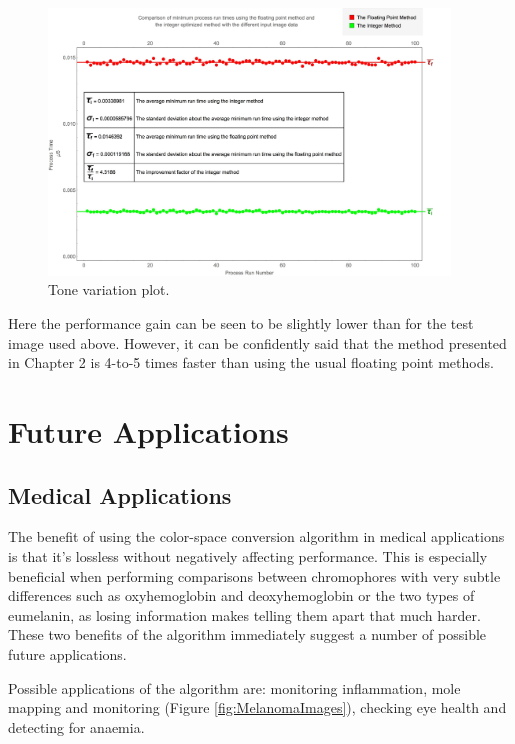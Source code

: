 \begin{figure}[h!]
  \centering
    \includegraphics[width=0.95\textwidth]{Chapter5/Figs/Tone_Variation_Plot.jpg}
    \caption{Tone variation plot.}\label{fig:ToneVariationPlot}
\end{figure}

Here the performance gain can be seen to be slightly lower than for the test image used above. However, it can be confidently said that the method presented in Chapter 2 is 4-to-5 times faster than using the usual floating point methods.

\section{Future Applications}\label{sec:FutureApplications}


\subsection{Medical Applications}\label{sec:MedicalApplications}

The benefit of using the color-space conversion algorithm in medical applications is that it's lossless without negatively affecting performance. This is especially beneficial when performing comparisons between chromophores with very subtle differences such as oxyhemoglobin and deoxyhemoglobin or the two types of eumelanin, as losing information makes telling them apart that much harder. These two benefits of the algorithm immediately suggest a number of possible future applications.

Possible applications of the algorithm are: monitoring inflammation, mole mapping and monitoring (Figure \ref{fig:MelanomaImages}), checking eye health and detecting for anaemia.

